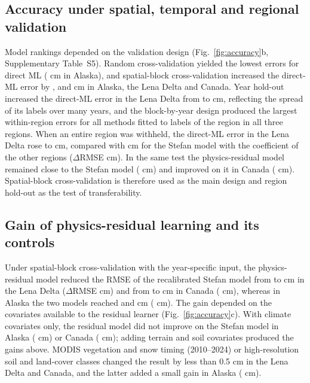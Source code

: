 \subsection{Accuracy under spatial, temporal and regional validation}
Model rankings depended on the validation design (Fig.~\ref{fig:accuracy}b, Supplementary Table~S5). Random cross-validation yielded the lowest errors for direct ML (\nrmseAkrandDz{} cm in Alaska), and spatial-block cross-validation increased the direct-ML error by \noptimAkDz, \noptimLeDz{} and \noptimCaDz{} cm in Alaska, the Lena Delta and Canada. Year hold-out increased the direct-ML error in the Lena Delta from \nrmseLeblkDz{} to \nrmseLeyrDz{} cm, reflecting the spread of its labels over many years, and the block-by-year design produced the largest within-region errors for all methods fitted to labels of the region in all three regions. When an entire region was withheld, the direct-ML error in the Lena Delta rose to \nrmseLeregDz{} cm, compared with \nrmseLeregPz{} cm for the Stefan model with the coefficient of the other regions ($\Delta$RMSE \ndrefLeregDz{} cm). In the same test the physics-residual model remained close to the Stefan model (\ndrefLeregRo{} cm) and improved on it in Canada (\ndrefCaregRo{} cm). Spatial-block cross-validation is therefore used as the main design and region hold-out as the test of transferability.

\subsection{Gain of physics-residual learning and its controls}
Under spatial-block cross-validation with the year-specific input, the physics-residual model reduced the RMSE of the recalibrated Stefan model from \nrmseLeblkPo{} to \nrmseLeblkRo{} cm in the Lena Delta ($\Delta$RMSE \ndrefLeblkRo{} cm) and from \nrmseCablkPo{} to \nrmseCablkRo{} cm in Canada (\ndrefCablkRo{} cm), whereas in Alaska the two models reached \nrmseAkblkPo{} and \nrmseAkblkRo{} cm (\ndrefAkblkRo{} cm). The gain depended on the covariates available to the residual learner (Fig.~\ref{fig:accuracy}c). With climate covariates only, the residual model did not improve on the Stefan model in Alaska (\ndfeatAkFclim{} cm) or Canada (\ndfeatCaFclim{} cm); adding terrain and soil covariates produced the gains above. MODIS vegetation and snow timing (2010--2024) or high-resolution soil and land-cover classes changed the result by less than 0.5 cm in the Lena Delta and Canada, and the latter added a small gain in Alaska (\ndfeatAkFhires{} cm).

